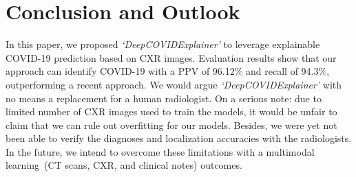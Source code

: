 \documentclass[conference]{IEEEtran}
\begin{document}

\section{Conclusion and Outlook}
\label{sec:co}
In this paper, we proposed \emph{`DeepCOVIDExplainer'} to leverage explainable COVID-19 prediction based on CXR images. Evaluation results show that our approach can identify COVID-19 with a PPV of 96.12\% and recall of 94.3\%, outperforming a recent approach. 
We would argue \emph{`DeepCOVIDExplainer'} 
with no means a replacement for a human radiologist. 
On a serious note: due to limited number of CXR images used to train the models, it would be unfair to claim that we can rule out overfitting for our models. 
Besides, we were yet not been able to verify the diagnoses and localization accuracies with the radiologists. 
In the future, we intend to overcome these limitations with a multimodal learning~(CT scans, CXR, and clinical notes) outcomes.



\end{document}
